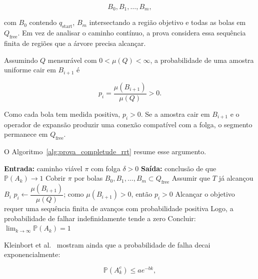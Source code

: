 \begin{equation}
    B_0, B_1, \ldots, B_m,
    \label{eq:rrt_cobertura_bolas}
\end{equation}

com $B_0$ contendo $q_{\mathrm{start}}$, $B_m$ intersectando a região objetivo e todas as bolas em $Q_{\mathrm{free}}$. Em vez de analisar o caminho contínuo, a prova considera essa sequência finita de regiões que a árvore precisa alcançar.

Assumindo $Q$ mensurável com $0 < \mu(Q) < \infty$, a probabilidade de uma amostra uniforme cair em $B_{i+1}$ é

\begin{equation}
    p_i = \frac{\mu(B_{i+1})}{\mu(Q)} > 0.
    \label{eq:probabilidade_avanco_rrt}
\end{equation}

Como cada bola tem medida positiva, $p_i > 0$. Se a amostra cair em $B_{i+1}$ e o operador de expansão produzir uma conexão compatível com a folga, o segmento permanece em $Q_{\mathrm{free}}$.

O Algoritmo~\ref{alg:prova_completude_rrt} resume esse argumento.

\begin{algorithm}[H]
\caption{Esquema de prova da completude probabilística do RRT}
\label{alg:prova_completude_rrt}
\begin{algorithmic}[1]
\State \textbf{Entrada:} caminho viável $\pi$ com folga $\delta > 0$
\State \textbf{Saída:} conclusão de que $\mathbb{P}(A_k) \rightarrow 1$
\State Cobrir $\pi$ por bolas $B_0, B_1, \ldots, B_m \subset Q_{\mathrm{free}}$
    \State Assumir que $T$ já alcançou $B_i$
    \State $p_i \gets \dfrac{\mu(B_{i+1})}{\mu(Q)}$; como $\mu(B_{i+1}) > 0$, então $p_i > 0$
\EndFor
\State Alcançar o objetivo requer uma sequência finita de avanços com probabilidade positiva
\State Logo, a probabilidade de falhar indefinidamente tende a zero
\State Concluir: $\lim_{k \to \infty}\mathbb{P}(A_k)=1$
\end{algorithmic}
\end{algorithm}

Kleinbort et al.~\cite{kleinbort2022probabilisticcompletenessrrtgeometric} mostram ainda que a probabilidade de falha decai exponencialmente:

\begin{equation}
    \mathbb{P}(A_k^c) \leq a e^{-bk},
    \label{eq:falha_exponencial_rrt}
\end{equation}

